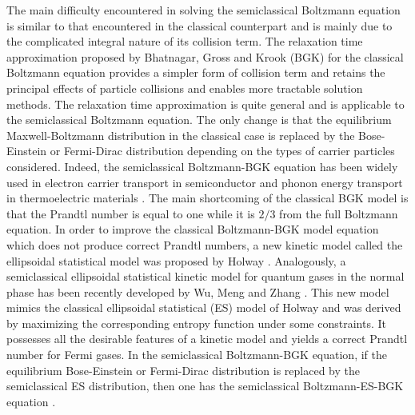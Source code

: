 \documentclass{rsproca}%
\begin{document}
The main difficulty encountered in solving the semiclassical Boltzmann equation is similar to that encountered in the classical counterpart and is mainly due to the complicated integral nature of its collision term.  The relaxation time approximation proposed by Bhatnagar, Gross and Krook (BGK) \cite{PhysRev.94.511} for the classical Boltzmann equation provides a simpler form of collision term and retains the principal effects of particle collisions and enables more tractable solution methods.  The relaxation time approximation is quite general and is applicable to the semiclassical Boltzmann equation.   The only change is that the equilibrium Maxwell-Boltzmann distribution in the classical case is replaced by the Bose-Einstein or Fermi-Dirac distribution depending on the types of carrier particles considered.  Indeed, the semiclassical Boltzmann-BGK equation has been widely used in electron carrier transport in semiconductor \cite{Lundstrom:2000,Fatemi1993209,Carrillo2003498,Majorana2001649,Carrillo2003JCEL,Carrillo2003b,Markowich2002,Pattamatta2009,Scaldaferri2007} and phonon energy transport in thermoelectric materials \cite{mit2005nanoscale}.   The main shortcoming of the classical BGK model is that the Prandtl number is equal to one while it is $2/3$ from the full Boltzmann equation.  In order to improve the classical Boltzmann-BGK model equation which does not produce correct Prandtl numbers, a new kinetic model called the ellipsoidal statistical model was proposed by Holway \cite{Holway1966}.  Analogously, a semiclassical ellipsoidal statistical kinetic model for quantum gases in the normal phase has been recently developed by Wu, Meng and Zhang \cite{Wu2012}.  This new model mimics the classical ellipsoidal statistical (ES) model of Holway \cite{Holway1966} and was derived by maximizing the corresponding entropy function under some constraints.   It possesses all the desirable features of a kinetic model and yields a correct Prandtl number for Fermi gases.   In the semiclassical Boltzmann-BGK equation, if the equilibrium Bose-Einstein or Fermi-Dirac distribution is replaced by the semiclassical ES distribution, then one has the semiclassical Boltzmann-ES-BGK equation \cite{Wu2012}.
\end{document}
